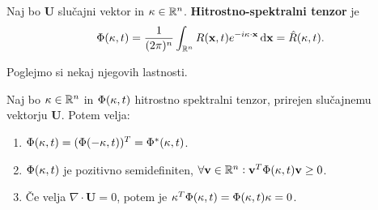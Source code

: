 \documentclass[mat2, tisk]{fmfdelo}
\newcommand{\R}{\mathbb R}
\newcommand{\bd}{\textbf}
\begin{document}
\begin{definicija}
Naj bo $\bd{U}$ slučajni vektor in $\text{\bd{$\kappa$}} \in \R^n$. \bd{Hitrostno-spektralni tenzor} je 
\begin{equation*}
\Phi(\text{\bd{$\kappa$}}, t) = \frac{1}{(2\pi)^n}\int_{\R^n} {R}(\bd{x}, t) e^{-i\text{\bd{$\kappa$}} \cdot \bd{x}} \dif \bd{x} = \hat{R}(\bd{\text{$\kappa$}}, t).
\end{equation*}
\end{definicija}

Poglejmo si nekaj njegovih lastnosti.
\begin{trditev}
\label{hitrostno_spektralni_tenzor_lastnosti}
Naj bo $\text{\bd{$\kappa$}} \in \R^n$ in $\Phi(\text{\bd{$\kappa$}}, t)$ hitrostno spektralni 
tenzor, prirejen slučajnemu vektorju $\bd{U}$. Potem velja:
\begin{enumerate}
  \item[i)] $\Phi(\text{\bd{$\kappa$}}, t) = (\Phi(-\text{\bd{$\kappa$}}, t))^T = \Phi^*(\text{\bd{$\kappa$}}, t)$.
  \item[ii)] $\Phi(\text{\bd{$\kappa$}}, t)$ je pozitivno semidefiniten, 
  $\forall \bd{v} \in \R^n: \bd{v}^T \Phi(\text{\bd{$\kappa$}}, t) \bd{v} \geq 0$.
  \item[iii)] Če velja $\nabla \cdot \bd{U} = 0$, potem je 
  $\text{\bd{$\kappa$}}^T \Phi(\text{\bd{$\kappa$}}, t) = \Phi(\text{\bd{$\kappa$}}, t) \text{\bd{$\kappa$}} = 0$.
\end{enumerate}
\end{trditev}
\end{document}
